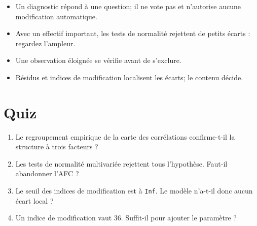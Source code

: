 \documentclass[
  french,
  11pt,
  a4paper,
  DIV=11,
  numbers=noendperiod]{scrreprt}
\providecommand{\tightlist}{%
  \setlength{\itemsep}{0pt}\setlength{\parskip}{0pt}}
\begin{document}
\begin{tcolorbox}[enhanced jigsaw, arc=.35mm, bottomrule=.15mm, bottomtitle=1mm, breakable, colback=white, colbacktitle=quarto-callout-important-color!10!white, colframe=quarto-callout-important-color-frame, coltitle=black, left=2mm, leftrule=.75mm, opacityback=0, opacitybacktitle=0.6, rightrule=.15mm, title={À retenir}, titlerule=0mm, toprule=.15mm, toptitle=1mm]

\begin{itemize}
\tightlist
\item
  Un diagnostic répond à une question; il ne vote pas et n'autorise
  aucune modification automatique.
\item
  Avec un effectif important, les tests de normalité rejettent de petits
  écarts : regardez l'ampleur.
\item
  Une observation éloignée se vérifie avant de s'exclure.
\item
  Résidus et indices de modification localisent les écarts; le contenu
  décide.
\end{itemize}

\end{tcolorbox}

\section{Quiz}\label{quiz-4}

\begin{enumerate}
\def\labelenumi{\arabic{enumi}.}
\tightlist
\item
  Le regroupement empirique de la carte des corrélations confirme-t-il
  la structure à trois facteurs ?
\item
  Les tests de normalité multivariée rejettent tous l'hypothèse. Faut-il
  abandonner l'AFC ?
\item
  Le seuil des indices de modification est à \texttt{Inf}. Le modèle
  n'a-t-il donc aucun écart local ?
\item
  Un indice de modification vaut 36. Suffit-il pour ajouter le paramètre
  ?
\end{enumerate}
\end{document}
